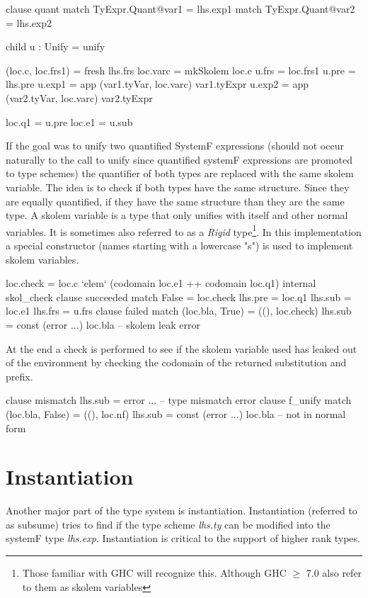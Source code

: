 \begin{code}
clause quant
  match TyExpr.Quant@var1 = lhs.exp1
  match TyExpr.Quant@var2 = lhs.exp2
  
  child u : Unify = unify
  
  (loc.c, loc.frs1) = fresh lhs.frs
  loc.varc = mkSkolem loc.c
  u.frs   = loc.frs1
  u.pre   = lhs.pre
  u.exp1  = app (var1.tyVar, loc.varc) var1.tyExpr
  u.exp2  = app (var2.tyVar, loc.varc) var2.tyExpr
          
  loc.q1  = u.pre
  loc.e1  = u.sub
\end{code}
If the goal was to unify two quantified SystemF expressions (should not occur naturally to the call to unify since quantified systemF expressions are promoted to type schemes) the quantifier of both types are replaced with the same skolem variable. The idea is to check if both types have the same structure. Since they are equally quantified, if they have the same structure than they are the same type.
A skolem variable is a type that only unifies with itself and other normal variables. It is sometimes also referred to as a \emph{Rigid} type\footnote{Those familiar with GHC will recognize this. Although GHC $\geq$ 7.0 also refer to them as skolem variables}. In this implementation a special constructor (names starting with a lowercase "s") is used to implement skolem variables.
\begin{code}                       
loc.check = loc.c `elem` (codomain loc.e1 ++ codomain loc.q1)
internal skol_check
   clause succeeded
     match False  = loc.check
     lhs.pre  = loc.q1
     lhs.sub  = loc.e1
     lhs.frs  = u.frs
   clause failed
     match (loc.bla, True) = ((), loc.check)
     lhs.sub = const (error ...) loc.bla -- skolem leak error
\end{code}
At the end a check is performed to see if the skolem variable used has leaked out of the environment by checking the codomain of the returned substitution and prefix.

\begin{code}
    clause mismatch
      lhs.sub = error ... -- type mismatch error
clause f_unify
  match (loc.bla, False) = ((), loc.nf)
  lhs.sub = const (error ...) loc.bla -- not in normal form
\end{code}

\section{Instantiation}
Another major part of the type system is instantiation. Instantiation (referred to as subsume) tries to find if the type scheme \emph{lhs.ty} can be modified into the systemF type \emph{lhs.exp}. Instantiation is critical to the support of higher rank types.


